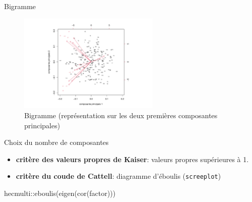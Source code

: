 \documentclass[
  ignorenonframetext,
]{beamer}
\newenvironment{Shaded}{\begin{snugshade}}{\end{snugshade}}
\newcommand{\FunctionTok}[1]{\textcolor[rgb]{0.28,0.35,0.67}{#1}}
\newcommand{\NormalTok}[1]{\textcolor[rgb]{0.00,0.23,0.31}{#1}}
\newcommand{\SpecialCharTok}[1]{\textcolor[rgb]{0.37,0.37,0.37}{#1}}
\providecommand{\tightlist}{%
  \setlength{\itemsep}{0pt}\setlength{\parskip}{0pt}}\usepackage{longtable,booktabs,array}
\begin{document}
\begin{frame}{Bigramme}
\protect\hypertarget{bigramme}{}
\begin{figure}

{\centering \includegraphics[width=0.6\textwidth,height=\textheight]{MATH60602-diapos3_files/figure-beamer/fig-bigramme-1.pdf}

}

\caption{\label{fig-bigramme}Bigramme (représentation sur les deux
premières composantes principales)}

\end{figure}
\end{frame}

\begin{frame}[fragile]{Choix du nombre de composantes}
\protect\hypertarget{choix-du-nombre-de-composantes}{}
\begin{itemize}
\tightlist
\item
  \textbf{critère des valeurs propres de Kaiser}: valeurs propres
  supérieures à 1.
\item
  \textbf{critère du coude de Cattell}: diagramme d'éboulis
  (\texttt{screeplot})
\end{itemize}

\begin{Shaded}
\begin{Highlighting}[]
\NormalTok{hecmulti}\SpecialCharTok{::}\FunctionTok{eboulis}\NormalTok{(}\FunctionTok{eigen}\NormalTok{(}\FunctionTok{cor}\NormalTok{(factor)))}
\end{Highlighting}
\end{Shaded}
\end{frame}
\end{document}

